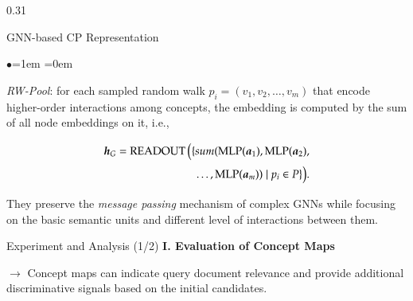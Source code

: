 \documentclass[serif,onlymath,final,xcolor=table]{beamer}
\begin{document}
\begin{frame}
\begin{columns}[t]
\begin{column}{0.31\linewidth}
\begin{block}{GNN-based CP Representation}
\begin{list}{$\bullet$}{\leftmargin=1em \itemindent=0em}
    \item \textit{RW-Pool}: for each sampled random walk $p_i = (v_1, v_2, \ldots, v_m)$ that encode higher-order interactions among concepts, the embedding is computed by the sum of all node embeddings on it, i.e.,
    \begin{small} 
    \begin{align*}
    \setlength{\abovedisplayskip}{3pt}
    \setlength{\belowdisplayskip}{3pt}
    \bm h_{G}=\operatorname{READOUT}\Big( 
    \{ sum ( \operatorname{MLP}(\bm a_1), \operatorname{MLP}(\bm a_2), \\ \ldots, \operatorname{MLP}(\bm a_m) ) \mid p_i \in P \}\Big).
    \end{align*}
    \end{small}
\end{list}
They preserve the \textit{message passing} mechanism of complex GNNs while focusing on the basic semantic units and different level of interactions between them.
\end{block}

\begin{block}{Experiment and Analysis (1/2)} 
\textbf{I. Evaluation of Concept Maps} 
\begin{table}[t]
\centering
\caption{The similarity of different concept map pairs.}
\label{tab:structure}
\end{table}
$\rightarrow$ Concept maps can indicate query document relevance and provide additional discriminative signals based on the initial candidates. 
\end{block}
\end{column}



\end{columns}
\end{frame}
\end{document}
